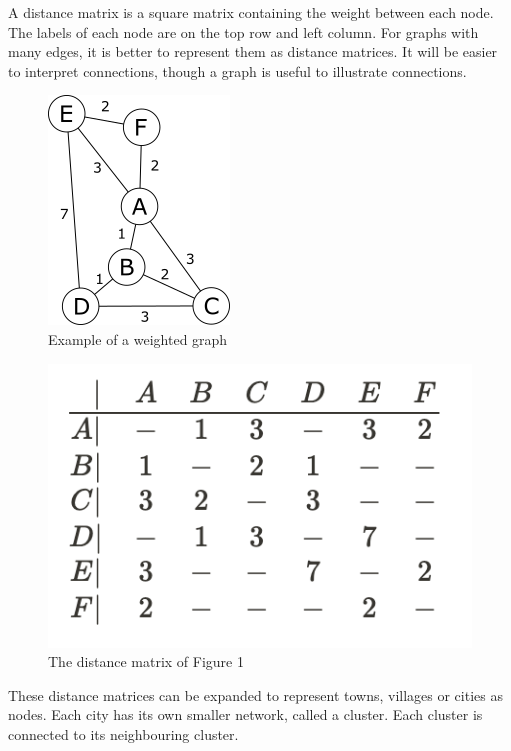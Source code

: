 \documentclass[twocolumn]{article}
\begin{document}
A distance matrix is a square matrix containing the weight between each node. The labels of each node are on the top row and left column.
For graphs with many edges, it is better to represent them as distance matrices. It will be easier to interpret connections, though a graph is useful to illustrate connections.


\begin{figure}[H]
\centering
\includegraphics[width=0.35\columnwidth]{Figures/Weighted Graph Example.png}
\caption{Example of a weighted graph}
\label{fig:examplegraph}
\end{figure}


\begin{figure}[H]
\centering
\includegraphics[width=0.65\columnwidth]{Figures/Distance Matrix Example.png}
\caption{The distance matrix of Figure 1}
\end{figure}


These distance matrices can be expanded to represent towns, villages or cities as nodes. Each city has its own smaller network, called a cluster. Each cluster is connected to its neighbouring cluster.
\end{document}
